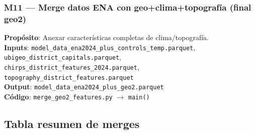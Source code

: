 \documentclass[11pt,a4paper]{article}
\begin{document}
\subsubsection{M11 — Merge datos ENA con geo+clima+topografía (final geo2)}
\textbf{Propósito}: Anexar características completas de clima/topografía.\\
\textbf{Inputs}: \texttt{model\_data\_ena2024\_plus\_controls\_temp.parquet}, \texttt{ubigeo\_district\_capitals.parquet}, \texttt{chirps\_district\_features\_2024.parquet}, \texttt{topography\_district\_features.parquet}\\
\textbf{Output}: \texttt{model\_data\_ena2024\_plus\_geo2.parquet}\\
\textbf{Código}: \texttt{merge\_geo2\_features.py} $\to$ \texttt{main()}

\subsection{Tabla resumen de merges}
\end{document}
